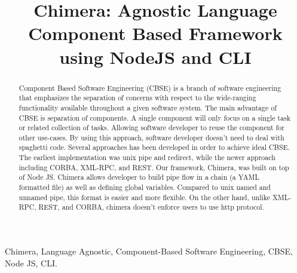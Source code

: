 \documentclass[conference]{IEEEtran}
\begin{document}
\title{Chimera: Agnostic Language Component Based Framework using NodeJS and CLI}

\author{
\and
{}
\and
{}
}

\maketitle


\begin{abstract}
    Component Based Software Engineering (CBSE) is a branch of software engineering that emphasizes the separation of concerns with respect to the wide-ranging functionality available throughout a given software system.  The main advantage of CBSE is separation of components. A single component will only focus on a single task or related collection of tasks. Allowing software developer to reuse the component for other use-cases. By using this approach, software developer doesn't need to deal with spaghetti code. Several approaches has been developed in order to achieve ideal CBSE. The earliest implementation was unix pipe and redirect, while the newer approach including CORBA, XML-RPC, and REST. Our framework, Chimera, was built on top of Node JS. Chimera allows developer to build pipe flow in a chain (a YAML formatted file) as well as defining global variables. Compared to unix named and unnamed pipe, this format is easier and more flexible. On the other hand, unlike XML-RPC, REST, and CORBA, chimera doesn't enforce users to use http protocol.
\end{abstract}

\begin{IEEEkeywords}
Chimera, Language Agnostic, Component-Based Software Engineering, CBSE, Node JS, CLI.
\end{IEEEkeywords}

\IEEEpeerreviewmaketitle
\end{document}
